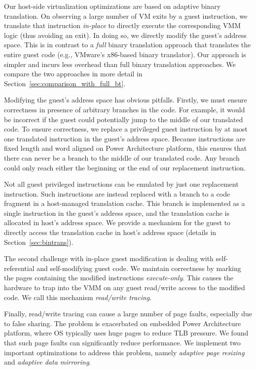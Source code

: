 \documentclass[10pt,twocolumn]{article}
\begin{document}
Our host-side virtualization optimizations are based on adaptive binary
translation. On observing a large number of VM exits by a guest instruction, we translate
that instruction {\em in-place} to directly execute the corresponding
VMM logic (thus avoiding an exit). In doing so, we directly modify the guest's
address space. This is in contrast to a {\em full} binary translation approach
that translates the entire guest code
(e.g., VMware's x86-based binary translator\cite{adams:asplos06}). Our approach is
simpler and incurs less overhead than full binary
translation approaches. We compare the two approaches in more detail in
Section~\ref{sec:comparison_with_full_bt}.

Modifying the guest's address space has obvious pitfalls.
Firstly, we must ensure correctness in presence
of arbitrary branches in the code. For example, it would be incorrect if the guest
could potentially jump to the middle of our translated code.
To ensure correctness, we replace a privileged guest instruction
by at most one translated instruction in the guest's address space. Because instructions
are fixed length and word aligned on Power Architecture platform, this ensures that
there can never be a branch to the middle of our translated
code. Any branch could only reach either the beginning or the end of our
replacement instruction.

Not all guest privileged instructions can be emulated by just one
replacement instruction.
Such instructions are instead replaced with a branch to a code
fragment in a host-managed translation cache. This branch is implemented as a
single instruction in the guest's address space, and the translation
cache is allocated in host's address space. We provide a mechanism for the guest
to directly access the translation cache in host's address
space (details in Section~\ref{sec:bintrans}).

The second challenge with in-place guest modification is dealing with
self-referential and self-modifying guest code. We maintain correctness by 
marking the pages containing the modified instructions {\em execute-only}. This
causes the hardware to trap into the VMM on any guest read/write access to the
modified code. We call this mechanism {\em read/write tracing}.

Finally, read/write tracing can cause a large number of
page faults, especially due to false sharing. The problem is
exacerbated on embedded Power Architecture platform, where OS typically uses
huge pages to reduce TLB pressure. We found that such page faults can
significantly reduce performance.
We implement two important optimizations to address this problem, namely
{\em adaptive page resizing} and {\em adaptive data mirroring}.
\end{document}
